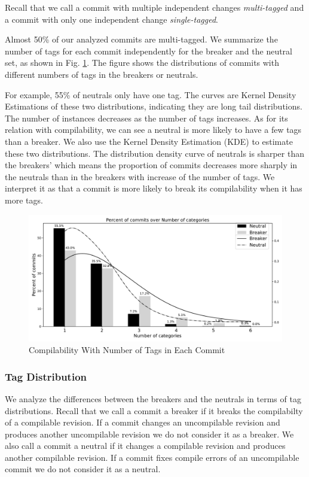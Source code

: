 Recall that we call a commit with multiple independent changes \textit{multi-tagged} and a commit with only one independent change \textit{single-tagged}.

Almost 50\% of our analyzed commits are multi-tagged.
We summarize the number of tags for each commit independently for the breaker and the neutral set, as shown in Fig. \ref{fig:num_tasks_fig}. 
The figure shows the distributions of commits with different numbers of tags in the breaker{}s or neutral{}s. 


For example, 55\% of neutral{}s only have one tag. 
The curves are Kernel Density Estimations of these two distributions, indicating they are long tail distributions. 
The number of instances decreases as the number of tags increases.
As for its relation with compilability, we can see a neutral is more likely to have a few tags than a breaker. 
We also use the Kernel Density Estimation (KDE) to estimate these two distributions. 
The distribution density curve of neutral{}s is sharper than the breaker{}s' which means the proportion of commits decreases more sharply in the neutral{}s than in the breaker{}s with increase of the number of tags. 
We interpret it as that a commit is more likely to break its compilability when it has more tags.

\begin{figure}[htbp]
\centerline{\includegraphics[scale=0.6]{figures/num_tasks_break_rate.pdf}}
\caption{Compilability With Number of Tags in Each Commit}
\label{fig:num_tasks_fig}
\end{figure}



\subsubsection{Tag Distribution}
We analyze the differences between the breakers and the neutrals in terms of tag distributions.
Recall that we call a commit a breaker if it breaks the compilabilty of a compilable revision.
If a commit changes an uncompilable revision and produces another uncompilable revision we do not consider it as a breaker.
We also call a commit a neutral if it changes a compilable revision and produces another compilable revision.
If a commit fixes compile errors of an uncompilable commit we do not consider it as a neutral.

